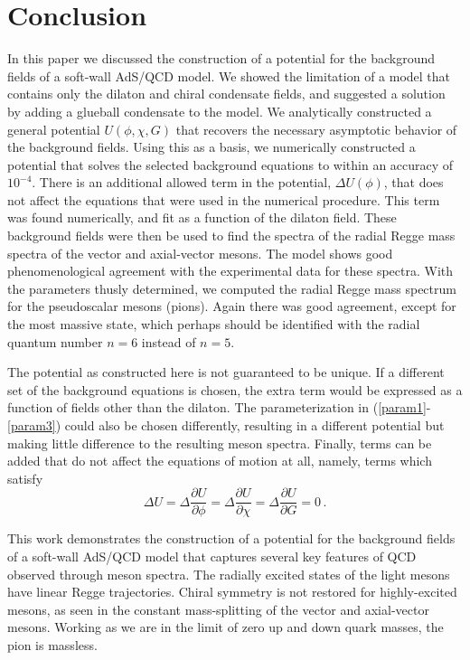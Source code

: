\documentclass[aps,prd,12pt,nofootinbib]{revtex4}
\newcommand{\be}{\begin{equation}}
\newcommand{\ee}{\end{equation}}
\begin{document}
\section{Conclusion}

In this paper we discussed the construction of a potential for the background fields of a soft-wall AdS/QCD model. 
We showed the limitation of a model that contains only the dilaton and chiral condensate fields, and suggested a solution by adding a glueball condensate to the model.
We analytically constructed a general potential $U(\phi,\chi,G)$ that recovers the necessary asymptotic behavior of the background fields.
Using this as a basis, we numerically constructed a potential that solves the selected background equations to within an accuracy of $10^{-4}$. 
There is an additional allowed term in the  potential, $\Delta U(\phi)$, that does not affect the equations that were used in the numerical procedure. 
This term was found numerically, and fit as a function of the dilaton field.
These background fields were then be used to find the spectra of the radial Regge mass spectra of the vector and axial-vector mesons.
The model shows good phenomenological agreement with the experimental data for these spectra.
With the parameters thusly determined, we computed the radial Regge mass spectrum for the pseudoscalar mesons (pions).
Again there was good agreement, except for the most massive state, which perhaps should be identified with the radial quantum number $n=6$ instead of $n=5$.

The potential as constructed here is not guaranteed to be unique.
If a different set of the background equations is chosen, the extra term would be expressed as a function of fields other than the dilaton.
The parameterization in (\ref{param1}-\ref{param3}) could also be chosen differently, resulting in a different potential but making little difference to the resulting meson spectra.
Finally, terms can be added that do not affect the equations of motion at all, namely, terms which satisfy 
\be
\Delta U = \Delta \frac{\partial U}{\partial \phi} = \Delta \frac{\partial U}{\partial \chi} = \Delta \frac{\partial U}{\partial G} =0 \, .
\ee

This work demonstrates the construction of a potential for the background fields of a soft-wall AdS/QCD model that captures several key features of QCD observed through meson spectra.
The radially excited states of the light mesons have linear Regge trajectories.
Chiral symmetry is not restored for highly-excited mesons, as seen in the constant mass-splitting of the vector and axial-vector mesons.
Working as we are in the limit of zero up and down quark masses, the pion is massless.
\end{document}
